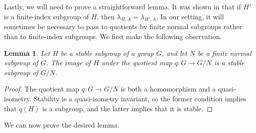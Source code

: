 \documentclass[11pt,letterpaper]{amsart}
\newtheorem{lemma}[theorem]{Lemma}
\theoremstyle{definition}
\theoremstyle{plain}
\theoremstyle{TheoremNum}
\begin{document}
Lastly, we will need to prove a straightforward lemma. It was shown in \cite{CRSZ} that if $H'$ is a finite-index subgroup of $H$, then $\lambda_{H,A} = \lambda_{H',A}$. In our setting, it will sometimes be necessary to pass to quotients by finite normal subgroups rather than to finite-index subgroups. We first make the following observation.

\begin{lemma}
    Let $H$ be a stable subgroup of a group $G$, and let $N$ be a finite normal subgroup of $G$. The image of $H$ under the quotient map $q : G \rightarrow G/N$ is a stable subgroup of $G/N$.
\end{lemma} 
\begin{proof}
    The quotient map $q: G \rightarrow G/N$ is both a homomorphism and a quasi-isometry. Stability is a quasi-isometry invariant, so the former condition implies that $q(H)$ is a subgroup, and the latter implies that it is stable.
\end{proof}
We can now prove the desired lemma.
\end{document}
